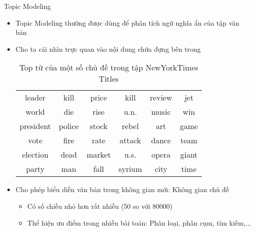 \documentclass[pdf]{beamer}
\begin{document}
\begin{frame}{Topic Modeling}
	\begin{itemize}
		\item Topic Modeling thường được dùng để phân tích ngữ nghĩa ẩn của tập văn bản
		\item Cho ta cái nhìn trực quan vào nội dung chứa đựng bên trong
			\begin{table}[H]
			\begin{center}
			\begin{tabular}{|c|c|c|c|c|c|}
			\hline
			leader&	kill&	price&	kill&	review&	jet\\
			world&	die&	rise&	u.n.&	music&	win\\
			president&	police&	stock&	rebel&	art&	game\\
			vote&	fire&	rate&	attack&	dance&	team\\
			election&	dead&	market&	u.s.&	opera&	giant\\
			party&	man&	fall&	syrium&	city&	time\\
			\hline
			\end{tabular}
			\caption{Top từ của một số chủ đề trong tập NewYorkTimes Titles}
			\label{tab:top10}
			\end{center}
			\end{table}
		\item Cho phép biểu diễn văn bản trong không gian mới: Không gian chủ đề
			\begin{itemize}
				\item Có số chiều nhỏ hơn rất nhiều (50 so với 80000)
				\item Thể hiện ưu điểm trong nhiều bài toán: Phân loại, phân cụm, tìm kiếm,...
			\end{itemize}
	\end{itemize}
\end{frame}
\end{document}
